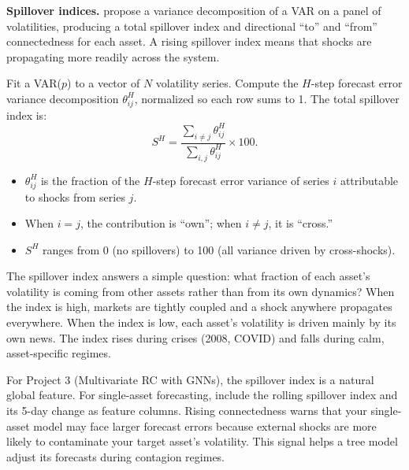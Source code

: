 \textbf{Spillover indices.}
\citet{DieboldYilmaz2012} propose a variance decomposition of a VAR on a panel of volatilities, producing a total spillover index and directional ``to'' and ``from'' connectedness for each asset.
A rising spillover index means that shocks are propagating more readily across the system.

\begin{definition}
Fit a VAR($p$) to a vector of $N$ volatility series. Compute the $H$-step forecast error variance decomposition $\theta_{ij}^H$, normalized so each row sums to 1.
The total spillover index is:
\begin{equation}\label{eq:spillover}
S^H = \frac{\sum_{i \neq j} \theta_{ij}^H}{\sum_{i,j} \theta_{ij}^H} \times 100.
\end{equation}
\begin{itemize}[nosep]
  \item $\theta_{ij}^H$ is the fraction of the $H$-step forecast error variance of series $i$ attributable to shocks from series $j$.
  \item When $i = j$, the contribution is ``own''; when $i \neq j$, it is ``cross.''
  \item $S^H$ ranges from 0 (no spillovers) to 100 (all variance driven by cross-shocks).
\end{itemize}
\end{definition}

\begin{intuition}
The spillover index answers a simple question: what fraction of each asset's volatility is coming from other assets rather than from its own dynamics? When the index is high, markets are tightly coupled and a shock anywhere propagates everywhere. When the index is low, each asset's volatility is driven mainly by its own news. The index rises during crises (2008, COVID) and falls during calm, asset-specific regimes.
\end{intuition}

\begin{projectconnection}
For Project 3 (Multivariate RC with GNNs), the spillover index is a natural global feature. For single-asset forecasting, include the rolling spillover index and its 5-day change as feature columns. Rising connectedness warns that your single-asset model may face larger forecast errors because external shocks are more likely to contaminate your target asset's volatility. This signal helps a tree model adjust its forecasts during contagion regimes.
\end{projectconnection}

